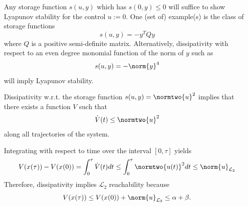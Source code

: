 \documentclass{homework}
\renewcommand{\L}{\mathcal{L}}
\begin{document}
\begin{letterenum}
Any storage function $s(u, y)$ which has $s(0, y) \leq 0$ will
suffice to show Lyapunov stability for the control $u:=0$. One 
(set of) example(s) is the class of storage functions
\begin{equation*}
    s(u, y) = - y^T Q y
\end{equation*}
where $Q$ is a positive semi-definite matrix. Alternatively,
dissipativity with respect to an even degree monomial
function of the norm of $y$ such as
\begin{equation*}
    s(u, y) = - \norm{y}^4
\end{equation*}
will imply Lyapunov stability.

\item Dissipativity w.r.t. the storage function
$s(u, y) = \normtwo{u}^2$ implies that there exists a function
$V$ such that
\begin{equation*}
    \dot{V}(t) \leq \normtwo{u}^2
\end{equation*}
along all trajectories of the system.

Integrating with respect to time over the interval $[0, \tau]$
yields
\begin{align*}
    V(x(\tau)) - V(x(0)) = \int_{0}^{\tau} \dot{V}(t) dt
        \leq \int_0^\tau \normtwo{u(t)}^2 dt  \leq \norm{u}_{\L_2}
\end{align*}
Therefore, dissipativity implies $\L_2$ reachability because
\begin{equation*}
    V(x(\tau)) \leq V(x(0)) + \norm{u}_{\L_2} \leq \alpha + \beta.
\end{equation*}




\end{letterenum}
\end{document}
